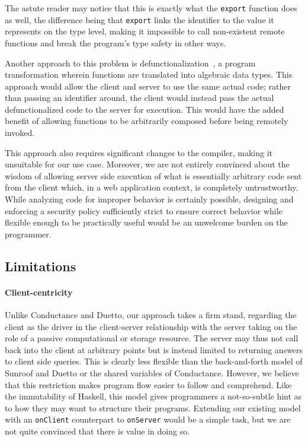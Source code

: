 \documentclass[preprint]{sigplanconf}
\begin{document}
The astute reader may notice that this is exactly what the \lstinline!export!
function does as well, the difference being that \lstinline!export! links the
identifier to the value it represents on the type level, making it impossible
to call non-existent remote functions and break the program's type safety in
other ways.

Another approach to this problem is
defunctionalization\ \cite{defunctionalization}, a program transformation
wherein functions are translated into algebraic data types. This approach would
allow the client and server to use the same actual code; rather than passing
an identifier around, the client would instead pass the actual defunctionalized
code to the server for execution. This would have the added benefit of allowing
functions to be arbitrarily composed before being remotely invoked.

This approach also requires significant changes to the compiler, making it
unsuitable for our use case. Moreover, we are not entirely convinced about the
wisdom of allowing server side execution of what is essentially arbitrary code
sent from the client which, in a web application context, is completely
untrustworthy. While analyzing code for improper behavior is certainly
possible, designing and enforcing a security policy sufficiently strict to
ensure correct behavior while flexible enough to be practically useful would be
an unwelcome burden on the programmer.

\subsection{Limitations}
\label{sec:limitations}

\paragraph{Client-centricity} Unlike Conductance and Duetto, our approach
takes a firm stand, regarding the client as the driver in the client-server
relationship with the server taking on the role of a passive computational
or storage resource. The server may thus not call back into the client at
arbitrary points but is instead limited to returning answers to client side
queries. This is clearly less flexible than the back-and-forth model of Sunroof
and Duetto or the shared variables of Conductance. However, we believe that
this restriction makes program flow easier to follow and comprehend. Like the
immutability of Haskell, this model gives programmers a not-so-subtle hint
as to how they may want to structure their programs. Extending our existing
model with an \lstinline!onClient! counterpart to \lstinline!onServer! would be
a simple task, but we are not quite convinced that there is value in doing so.
\end{document}
